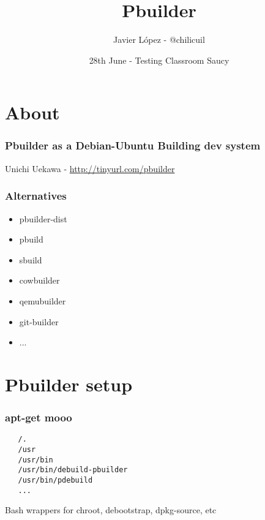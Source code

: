 \documentclass[dvipsnames]{beamer}
\title{Pbuilder}
\author[Javier López]{Javier López - @chilicuil}
\institute[Testing Classroom Saucy]
{\url{https://wiki.ubuntu.com/Testing/Activities/Classroom/Saucy}}
\date[2013]
     {28th June - Testing Classroom Saucy}
\begin{document}
\begin{frame}
  \titlepage
\end{frame}

\section[About]{About}
\begin{frame}
  \frametitle{Pbuilder as a Debian-Ubuntu Building dev system}
  \begin{center}
    {Unichi Uekawa -}
    \url{http://tinyurl.com/pbuilder}
  \end{center}
\end{frame}

\begin{frame}
  \frametitle{Alternatives}
  \begin{itemize}
  \item pbuilder-dist
  \item pbuild
  \item sbuild
  \item cowbuilder
  \item qemubuilder
  \item git-builder
  \item ...
  \end{itemize}
\end{frame}
\section[Installation]{Pbuilder setup}

\begin{frame}[fragile]
  \frametitle {apt-get mooo}
  
  \begin{center}
      {\vspace{3 mm}}
  \end{center}

\begin{verbatim}
   /.
   /usr
   /usr/bin
   /usr/bin/debuild-pbuilder
   /usr/bin/pdebuild
   ...
\end{verbatim}
  \begin{center}
        Bash wrappers for chroot, debootstrap, dpkg-source, etc
  \end{center}
\end{frame}
\end{document}
